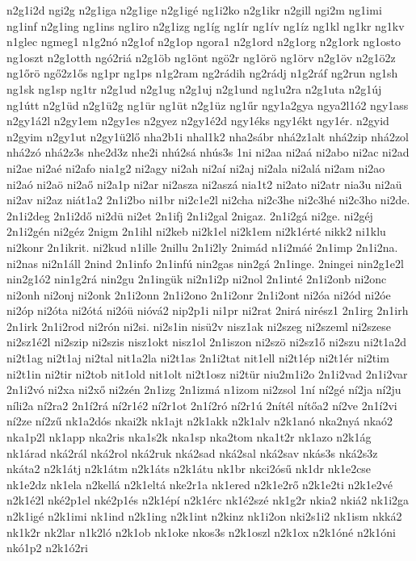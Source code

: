 {n2g1i2d
ngi2g
n2g1iga
n2g1ige
n2g1igé
ng1i2ko
n2g1ikr
n2gill
ngi2m
ng1imi
ng1inf
n2g1ing
ng1ins
ng1iro
n2g1izg
ng1íg
ng1ír
ng1ív
ng1íz
ng1kl
ng1kr
ng1kv
n1glec
ngmeg1
n1g2nó
n2g1of
n2g1op
ngora1
n2g1ord
n2g1org
n2g1ork
ng1osto
ng1oszt
n2g1otth
ngó2riá
n2g1öb
ng1önt
ngö2r
ng1örö
ng1örv
n2g1öv
n2g1ö2z
ng1őrö
ngő2z1ős
ng1pr
ng1ps
n1g2ram
ng2rádih
ng2rádj
n1g2ráf
ng2run
ng1sh
ng1sk
ng1sp
ng1tr
n2g1ud
n2g1ug
n2g1uj
n2g1und
ng1u2ra
n2g1uta
n2g1új
ng1útt
n2g1üd
n2g1ü2g
ng1ür
ng1üt
n2g1üz
ng1űr
ngy1a2gya
ngya2l1ó2
ngy1ass
n2gy1á2l
n2gy1em
n2gy1es
n2gyez
n2gy1é2d
ngy1éks
ngy1ékt
ngy1ér.
n2gyid
n2gyim
n2gy1ut
n2gy1ü2lő
nha2b1i
nhal1k2
nha2sábr
nhá2z1alt
nhá2zip
nhá2zol
nhá2zó
nhá2z3s
nhe2d3z
nhe2i
nhú2sá
nhús3s
1ni
ni2aa
ni2aá
ni2abo
ni2ac
ni2ad
ni2ae
ni2aé
ni2afo
nia1g2
ni2agy
ni2ah
ni2aí
ni2aj
ni2ala
ni2alá
ni2am
ni2ao
ni2aó
ni2aö
ni2aő
ni2a1p
ni2ar
ni2asza
ni2aszá
nia1t2
ni2ato
ni2atr
nia3u
ni2aü
ni2av
ni2az
niát1a2
2n1i2bo
ni1br
ni2c1e2l
ni2cha
ni2c3he
ni2c3hé
ni2c3ho
ni2de.
2n1i2deg
2n1i2dő
ni2dü
ni2et
2n1ifj
2n1i2gal
2nigaz.
2n1i2gá
ni2ge.
ni2géj
2n1i2gén
ni2géz
2nigm
2n1ihl
ni2keb
ni2k1el
ni2k1em
ni2k1érté
nikk2
ni1klu
ni2konr
2n1ikrit.
ni2kud
n1ille
2nillu
2n1i2ly
2nimád
n1i2máé
2n1imp
2n1i2na.
ni2nas
ni2n1áll
2nind
2n1info
2n1infú
nin2gas
nin2gá
2n1inge.
2ningei
nin2g1e2l
nin2g1ó2
nin1g2rá
nin2gu
2n1ingük
ni2n1i2p
ni2nol
2n1inté
2n1i2onb
ni2onc
ni2onh
ni2onj
ni2onk
2n1i2onn
2n1i2ono
2n1i2onr
2n1i2ont
ni2óa
ni2ód
ni2óe
ni2óp
ni2óta
ni2ótá
ni2óü
nióvá2
nip2p1i
ni1pr
ni2rat
2nirá
nirész1
2n1irg
2n1irh
2n1irk
2n1i2rod
ni2rón
ni2si.
ni2s1in
nisü2v
nisz1ak
ni2szeg
ni2szeml
ni2szese
ni2sz1é2l
ni2szip
ni2szis
nisz1okt
nisz1ol
2n1iszon
ni2szö
ni2sz1ő
ni2szu
ni2t1a2d
ni2t1ag
ni2t1aj
ni2tal
nit1a2la
ni2t1as
2n1i2tat
nit1ell
ni2t1ép
ni2t1ér
ni2tim
ni2t1in
ni2tir
ni2tob
nit1old
nit1olt
ni2t1osz
ni2tür
niu2m1i2o
2n1i2vad
2n1i2var
2n1i2vó
ni2xa
ni2xő
ni2zén
2n1izg
2n1izmá
n1izom
ni2zsol
1ní
ní2gé
ní2ja
ní2ju
níli2a
ní2ra2
2n1í2rá
ní2r1é2
ní2r1ot
2n1í2ró
ní2r1ú
2nítél
nítőa2
ní2ve
2n1í2vi
ní2ze
ní2zű
nk1a2dós
nkai2k
nk1ajt
n2k1akk
n2k1alv
n2k1anó
nka2nyá
nkaó2
nka1p2l
nk1app
nka2ris
nka1s2k
nka1sp
nka2tom
nka1t2r
nk1azo
n2k1ág
nk1árad
nká2rál
nká2rol
nká2ruk
nká2sad
nká2sal
nká2sav
nkás3s
nká2s3z
nkáta2
n2k1átj
n2k1átm
n2k1áts
n2k1átu
nk1br
nkci2ósű
nk1dr
nk1e2cse
nk1e2dz
nk1ela
n2kellá
n2k1eltá
nke2r1a
nk1ered
n2k1e2rő
n2k1e2ti
n2k1e2vé
n2k1é2l
nké2p1el
nké2p1és
n2k1épí
n2k1érc
nk1é2szé
nk1g2r
nkia2
nkiá2
nk1i2ga
n2k1igé
n2k1imi
nk1ind
n2k1ing
n2k1int
n2kinz
nk1i2on
nki2s1i2
nk1ism
nkká2
nk1k2r
nk2lar
n1k2ló
n2k1ob
nk1oke
nkos3s
n2k1oszl
n2k1ox
n2k1óné
n2k1óni
nkó1p2
n2k1ó2ri
}
